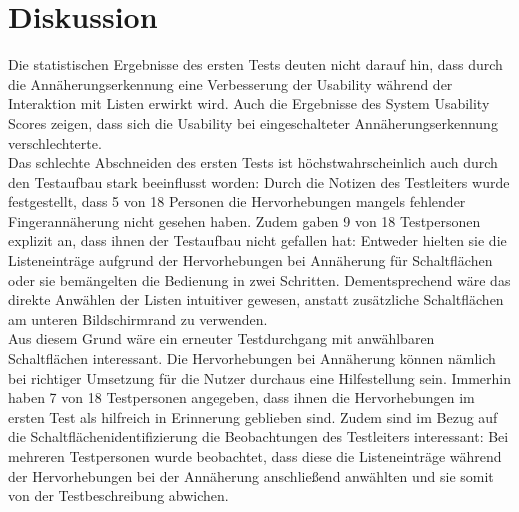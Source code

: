 \documentclass[12pt,numbers=noenddot,parskip,bibliography=totocnumbered,listof=totocnumbered]{scrreprt}
\begin{document}
\chapter{Diskussion}
Die statistischen Ergebnisse des ersten Tests deuten nicht darauf hin, dass durch die Annäherungserkennung eine Verbesserung der Usability während der Interaktion mit Listen erwirkt wird. Auch die Ergebnisse des System Usability Scores zeigen, dass sich die Usability bei eingeschalteter Annäherungserkennung verschlechterte.\\
Das schlechte Abschneiden des ersten Tests ist höchstwahrscheinlich auch durch den Testaufbau stark beeinflusst worden: Durch die Notizen des Testleiters wurde festgestellt, dass 5 von 18 Personen die Hervorhebungen mangels fehlender Fingerannäherung nicht gesehen haben. Zudem gaben 9 von 18 Testpersonen explizit an, dass ihnen der Testaufbau nicht gefallen hat: Entweder hielten sie die Listeneinträge aufgrund der Hervorhebungen bei Annäherung für Schaltflächen oder sie bemängelten die Bedienung in zwei Schritten. Dementsprechend wäre das direkte Anwählen der Listen intuitiver gewesen, anstatt zusätzliche Schaltflächen am unteren Bildschirmrand zu verwenden.\\
Aus diesem Grund wäre ein erneuter Testdurchgang mit anwählbaren Schaltflächen interessant. Die Hervorhebungen bei Annäherung können nämlich bei richtiger Umsetzung für die Nutzer durchaus eine Hilfestellung sein. Immerhin haben 7 von 18 Testpersonen angegeben, dass ihnen die Hervorhebungen im ersten Test als hilfreich in Erinnerung geblieben sind. Zudem sind im Bezug auf die Schaltflächenidentifizierung die Beobachtungen des Testleiters interessant: Bei mehreren Testpersonen wurde beobachtet, dass diese die Listeneinträge während der Hervorhebungen bei der Annäherung anschließend anwählten und sie somit von der Testbeschreibung abwichen.
\end{document}
